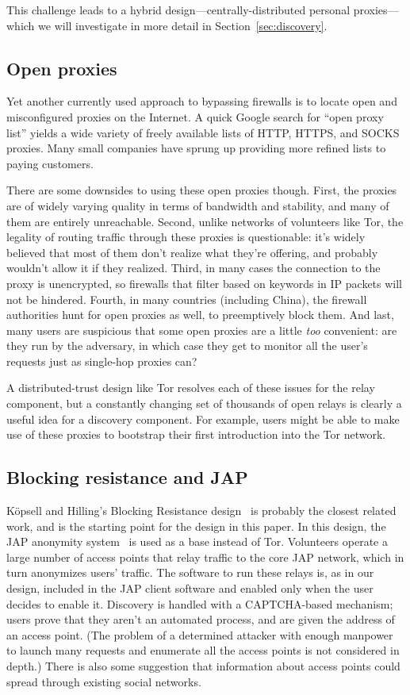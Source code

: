 \documentclass{llncs}
\begin{document}
This challenge leads to a hybrid design---centrally-distributed
personal proxies---which we will investigate in more detail in
Section~\ref{sec:discovery}.

\subsection{Open proxies}

Yet another currently used approach to bypassing firewalls is to locate
open and misconfigured proxies on the Internet. A quick Google search
for ``open proxy list'' yields a wide variety of freely available lists
of HTTP, HTTPS, and SOCKS proxies. Many small companies have sprung up
providing more refined lists to paying customers.

There are some downsides to using these open proxies though. First,
the proxies are of widely varying quality in terms of bandwidth and
stability, and many of them are entirely unreachable. Second, unlike
networks of volunteers like Tor, the legality of routing traffic through
these proxies is questionable: it's widely believed that most of them
don't realize what they're offering, and probably wouldn't allow it if
they realized. Third, in many cases the connection to the proxy is
unencrypted, so firewalls that filter based on keywords in IP packets
will not be hindered. Fourth, in many countries (including China), the
firewall authorities hunt for open proxies as well, to preemptively
block them. And last, many users are suspicious that some
open proxies are a little \emph{too} convenient: are they run by the
adversary, in which case they get to monitor all the user's requests
just as single-hop proxies can?

A distributed-trust design like Tor resolves each of these issues for
the relay component, but a constantly changing set of thousands of open
relays is clearly a useful idea for a discovery component. For example,
users might be able to make use of these proxies to bootstrap their
first introduction into the Tor network.

\subsection{Blocking resistance and JAP}

K\"{o}psell and Hilling's Blocking Resistance
design~\cite{koepsell:wpes2004} is probably
the closest related work, and is the starting point for the design in this
paper.  In this design, the JAP anonymity system~\cite{web-mix} is used
as a base instead of Tor.  Volunteers operate a large number of access
points that relay traffic to the core JAP
network, which in turn anonymizes users' traffic.  The software to run these
relays is, as in our design, included in the JAP client software and enabled
only when the user decides to enable it.  Discovery is handled with a
CAPTCHA-based mechanism; users prove that they aren't an automated process,
and are given the address of an access point.  (The problem of a determined
attacker with enough manpower to launch many requests and enumerate all the
access points is not considered in depth.)  There is also some suggestion
that information about access points could spread through existing social
networks.
\end{document}

